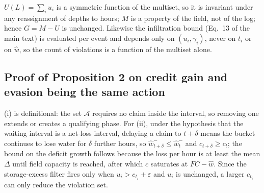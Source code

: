$U(L)=\sum_i u_i$ is a symmetric function of the multiset, so it is invariant
under any reassignment of depths to hours; $M$ is a property of the field, not
of the log; hence $G=M-U$ is unchanged. Likewise the infiltration bound (Eq.~13
of the main text) is evaluated per event and depends only on $(u_i,\gamma_i)$,
never on $t_i$ or on $\hat w$, so the count of violations is a function of the
multiset alone.

\subsection*{Proof of Proposition 2 on credit gain and evasion being the same action}

(i) is definitional: the set $\mathcal{A}$ requires no claim inside the
interval, so removing one extends or creates a qualifying phase. For (ii), under the
hypothesis that the waiting interval is a net-loss interval, delaying a claim to
$t+\delta$ means the bucket continues to lose water for $\delta$ further
hours, so $\hat w_{t+\delta}^{-}\le\hat w_t^{-}$ and
$c_{t+\delta}\ge c_t$; the bound on the deficit growth follows because the
loss per hour is at least the mean $\overline{\Delta}$ until field capacity
is reached, after which $c$ saturates at $FC-\hat w$. Since the storage-excess
filter fires only when $u_i>c_{t_i}+\varepsilon$ and $u_i$ is unchanged, a larger
$c_{t_i}$ can only reduce the violation set.

